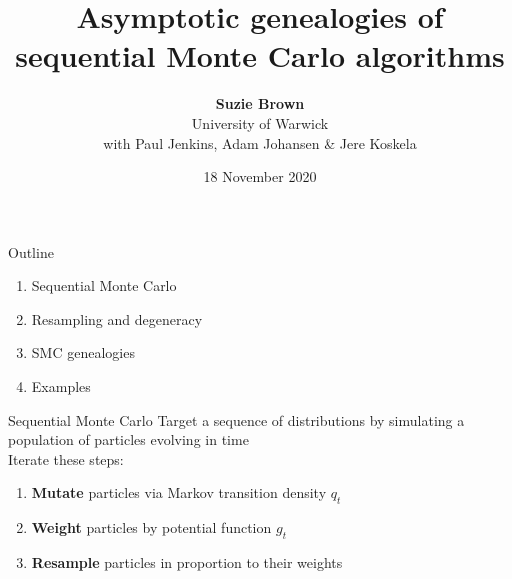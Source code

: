 \documentclass[aspectratio=169]{beamer}
\title[Genealogies of SMC Algorithms]{Asymptotic genealogies of sequential Monte Carlo algorithms}
\author[Suzie Brown]{\textbf{Suzie Brown} \\ University of Warwick \\ with Paul Jenkins, Adam Johansen \& Jere Koskela}
\date{18 November 2020}
\theoremstyle{definition}
\begin{document}
\begin{frame}
\maketitle
\end{frame}

\begin{frame}{Outline}
\begin{enumerate}
\item Sequential Monte Carlo
\item Resampling and degeneracy
\item SMC genealogies
\item Examples
\end{enumerate}
\end{frame}


\begin{frame}{Sequential Monte Carlo}
Target a sequence of distributions by simulating a population of particles evolving in time\\[10pt]
\pause
Iterate these steps:
\begin{enumerate}
\item \textbf{Mutate} particles via Markov transition density $q_t$
\item \textbf{Weight} particles by potential function $g_t$
\item \textbf{Resample} particles in proportion to their weights
\end{enumerate}
\end{frame}
\end{document}
